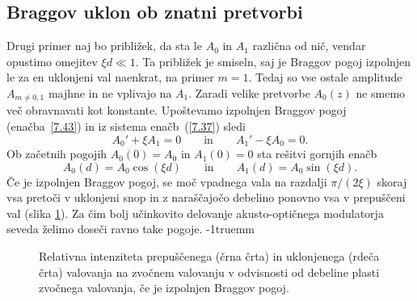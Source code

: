 \subsection*{Braggov uklon ob znatni pretvorbi}
Drugi primer naj bo približek, da sta le $A_{0}$ in $A_{1}$ različna od nič, 
vendar opustimo omejitev $\xi d\ll 1$. Ta približek je smiseln, saj je 
Braggov pogoj izpolnjen le za en uklonjeni val naenkrat, na
primer $m=1$. Tedaj so vse ostale amplitude $A_{m\ne0,1}$
majhne in ne vplivajo na $A_{1}$. Zaradi velike pretvorbe 
$A_{0}(z)$ ne smemo več obravnavati kot konstante. Upoštevamo 
izpolnjen Braggov pogoj (enačba~\ref{7.43}) in iz sistema enačb~(\ref{7.37})
sledi
\begin{equation}
A_{0}'+\xi A_{1}  =  0 \qquad \mathrm{in} \qquad A_{1}'-\xi A_{0} =  0.
\end{equation}
Ob začetnih pogojih $A_{0}(0)=A_{0}$ in $A_{1}(0)=0$ sta rešitvi gornjih enačb
\begin{equation}
A_{0}(d) = A_{0}\cos (\xi d) \qquad \mathrm{in} \qquad A_{1}(d) = A_{0}\sin (\xi d).
\end{equation}
Če je izpolnjen Braggov pogoj, se moč vpadnega vala na razdalji $\pi/(2\xi)$
skoraj vsa pretoči v uklonjeni snop in z naraščajočo debelino ponovno vsa v
prepuščeni val (slika \ref{s7.10}).
Za čim bolj učinkovito delovanje akusto-optičnega modulatorja seveda
želimo doseči ravno take pogoje.
\vglue-1truemm
\begin{figure}[h]
\centering
\def\svgwidth{80truemm} 

\caption{Relativna intenziteta prepuščenega (črna črta) in uklonjenega (rdeča črta) 
valovanja na zvočnem valovanju v odvisnosti od debeline plasti zvočnega valovanja, če
je izpolnjen Braggov pogoj.}
\label{s7.10}
\end{figure}

